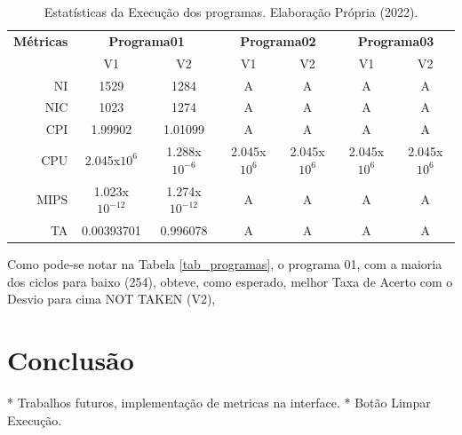 \documentclass[12pt]{article}
\begin{document}
\begin{table}[ht]
  \label{tab_programas}
  \caption{Estatísticas da Execução dos programas. Elaboração Própria (2022).}
  \begin{center}
    \begin{tabular}{rcccccc}
      \hline
      \textbf{Métricas} & \multicolumn{2}{c}{\textbf{Programa01}} & \multicolumn{2}{c}{\textbf{Programa02}} & \multicolumn{2}{c}{\textbf{Programa03}}                                              \\
                        & V1                                      & V2                                      & V1                                      & V2           & V1           & V2           \\
      \hline
      NI                & 1529                                    & 1284                                    & A                                       & A            & A            & A            \\
      NIC               & 1023                                    & 1274                                    & A                                       & A            & A            & A            \\
      CPI               & 1.99902                                 & 1.01099                                 & A                                       & A            & A            & A            \\
      CPU               & 2.045x$10^6$                            & 1.288x$10^{-6}$                         & 2.045x$10^6$                            & 2.045x$10^6$ & 2.045x$10^6$ & 2.045x$10^6$ \\
      MIPS              & 1.023x$10^{-12}$                        & 1.274x$10^{-12}$                        & A                                       & A            & A            & A            \\
      TA                & 0.00393701                              & 0.996078                                & A                                       & A            & A            & A            \\
    \end{tabular}
  \end{center}
  \label{tab:multicol}
\end{table}

Como pode-se notar na Tabela \ref{tab_programas}, o programa 01, com a maioria dos ciclos para baixo (254), obteve, como esperado, melhor Taxa de Acerto com o Desvio para cima NOT TAKEN (V2),

\section{Conclusão}\label{sec:figs}

* Trabalhos futuros, implementação de metricas na interface.
* Botão Limpar Execução.



\end{document}
